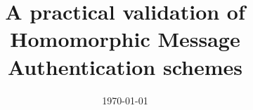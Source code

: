 \documentclass[a4paper,11pt,twoside]{Thesis}
\begin{document}
\frontmatter

\title  {A practical validation of Homomorphic Message Authentication schemes}
\addresses  {\groupname\\\deptname\\\univname}
\date       {\today}
\subject    {}
\keywords   {}

\maketitle


\fancyhead{}
\rhead{\thepage}
\lhead{}

\pagestyle{fancy}

%

%
%
%


\abstractpage{
  
  

}
\cleardoublepage
\end{document}
